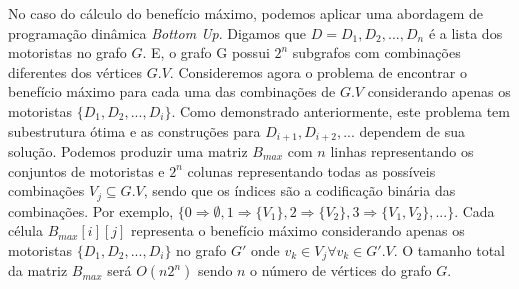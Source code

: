 \documentclass{article}
\begin{document}

No caso do cálculo do benefício máximo, podemos aplicar uma abordagem de programação dinâmica \textit{Bottom Up}.
Digamos que $ D = {D_1, D_2, ..., D_n} $ é a lista dos motoristas no grafo $ G $. E, o grafo G possui $ 2^n $ 
subgrafos com combinações diferentes dos vértices $ G.V $. Consideremos agora o problema de encontrar 
o benefício máximo para cada uma das combinações de $ G.V $ considerando apenas os motoristas $ \{ D_1, D_2, ..., D_i \} $.
Como demonstrado anteriormente, este problema tem subestrutura ótima e as construções para $ D_{i+1}, D_{i+2}, ... $
dependem de sua solução. Podemos produzir uma matriz $ B_{max} $ com $ n $ linhas representando os conjuntos
de motoristas e $ 2^n $ colunas representando todas as possíveis combinações $ V_j \subseteq G.V $, sendo que os índices 
são a codificação binária das combinações. Por exemplo, $ \{ 0 \Rightarrow \emptyset, 1 \Rightarrow \{ V_1\},
2 \Rightarrow \{ V_2\}, 3 \Rightarrow \{ V_1, V_2\}, ... \} $. Cada célula $ B_{max}[i][j] $ representa o benefício máximo
considerando apenas os motoristas $ \{ D_1, D_2, ..., D_i \} $ no grafo $ G' $ onde $ v_k \in V_j \forall v_k \in G'.V $.
O tamanho total da matriz $ B_{max} $ será $ O(n2^n) $ sendo $ n $ o número de vértices do grafo $ G $.
\end{document}
